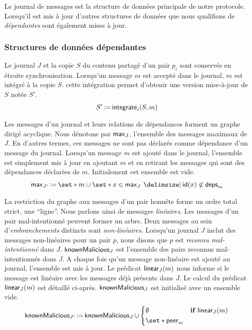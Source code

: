 Le journal de messages est la structure de données principale de notre protocole.
Lorsqu'il est mis à jour d'autres structures de données que nous qualifions de \emph{dépendantes} sont également mises à jour.

\subsubsection{Structures de données dépendantes}

Le journal $J$ et la copie $S$ du contenu partagé d'un pair $p_i$ sont conservés en étroite synchronisation.
Lorsqu'un message $m$ est accepté dans le journal, $m$ est intégré à la copie $S$.
cette intégration permet d'obtenir une version mise-à-jour de $S$ notée $S'$.
%
\begin{equation*}
    S' \operatorname{\vcentcolon=} \operatorname{\mathsf{integrate}}_i(S, m)
\end{equation*}

Les messages d'un journal et leurs relations de dépendances forment un graphe dirigé acyclique.
Nous dénotons par $\operatorname{\mathsf{max}}_J$, l'ensemble des messages maximaux de $J$.
En d'autres termes, ces messages ne sont pas déclarés comme dépendance d'un message du journal.
Lorsqu'un message $m$ est ajouté dans le journal, l'ensemble est simplement mis à jour en ajoutant $m$ et en retirant les messages qui sont des dépendances déclarées de $m$.
Initialement cet ensemble est vide.
%
\begin{equation*}
    \trm{max}_{J'} \assign \set*{m} \cup \set*{x \in \trm{max}_J \given \trm{id}(x) \not\in \trm{deps}_m}
\end{equation*}

La restriction du graphe aux messages d'un pair honnête forme un ordre total strict, une \enquote{ligne}.
Nous parlons ainsi de messages \emph{linéaires}.
Les messages d'un pair mal-intentionné peuvent former un arbre.
Deux messages au sein d'\emph{embranchements} distincts sont \emph{non-linéaires}.
Lorsqu'un journal $J$ inclut des messages non-linéaires pour un pair $p$, nous disons que $p$ est \emph{reconnu mal-intentionné} dans $J$.
$\operatorname{\mathsf{knownMalicious}}_J$ est l'ensemble des pairs reconnus mal-intentionnés dans $J$.
A chaque fois qu'un message non-linéaire est ajouté au journal, l'ensemble est mis à jour.
Le prédicat $\operatorname{\mathsf{linear}}_J(m)$ nous informe si le message est linéaire avec les messages déjà présents dans $J$.
Le calcul du prédicat $\operatorname{\mathsf{linear}}_J(m)$ est détaillé ci-après.
$\operatorname{\mathsf{knownMalicious}}_J$ est initialisé avec un ensemble vide.
%
\begin{equation*}
    \trm{knownMalicious}_{J'} \assign \trm{knownMalicious}_J \cup \begin{dcases}
        \emptyset & \when \trm{linear}_J(m)\\
        \set*{\trm{peer}_m} &
    \end{dcases}
\end{equation*}

